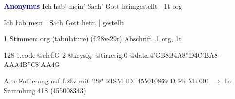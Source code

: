 \documentclass[twocolumn]{book}
\begin{document}
\newline \par \vspace{7pt} \textcolor{darkblue}{\textbf{Anonymus  }}
\newline Ich hab' mein' Sach' Gott heimgestellt - 1t
\newline org
\newline \begin{itshape}[f.28v, at left:] Ich hab mein | Sach Gott heim | gestellt\end{itshape} 
\newline \textcolor{darkblue}{}  1 Stimmen: org (tabulature)  (f.28v-29r)
\newline Abschrift
.1  org, 1t  
\begin{filecontents*}{128-1.code}
@clef:G-2
@keysig:
@timesig:0
@data:4'GB8B4A8''D4C'BA8-{AAA}4B''C{8'AA}4G
\end{filecontents*}
\newline
%
\newline Alte Foliierung auf f.28v mit "29"
\newline RISM-ID: 455010869
\newline D-Fh  Ms 001
\newline $\rightarrow$ In Sammlung 418 (455008343)
      
\end{document}
